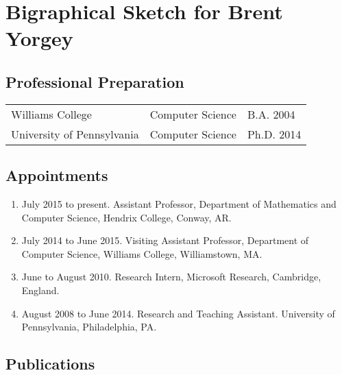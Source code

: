 \section*{Bigraphical Sketch for Brent Yorgey}

\subsection*{Professional Preparation}


\begin{tabular}{lll}
Williams College           & Computer Science   & B.A. 2004  \\
University of Pennsylvania & Computer Science   & Ph.D. 2014 \\
\end{tabular}

\subsection*{Appointments}

\begin{enumerate}\itemsep 0pt
\item July 2015 to present.  Assistant Professor, Department of
  Mathematics and Computer Science, Hendrix College, Conway, AR.

\item July 2014 to June 2015. Visiting Assistant Professor, Department of
  Computer Science, Williams College, Williamstown, MA.

\item June to August 2010.  Research Intern, Microsoft Research,
  Cambridge, England.

\item August 2008 to June 2014. Research and
  Teaching Assistant. University of Pennsylvania, Philadelphia, PA.
\end{enumerate}


\subsection*{Publications}

